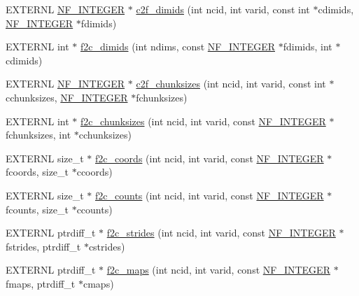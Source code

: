 \begin{DoxyCompactItemize}
\item 
E\+X\+T\+E\+R\+NL \hyperlink{ncfortran_8h_a0fd3f9e9fc30661142a1fb549af678e7}{N\+F\+\_\+\+I\+N\+T\+E\+G\+ER} $\ast$ \hyperlink{fort-lib_8c_a7ad9c588c0601d0aac54053a2dfc5fb1}{c2f\+\_\+dimids} (int ncid, int varid, const int $\ast$cdimids, \hyperlink{ncfortran_8h_a0fd3f9e9fc30661142a1fb549af678e7}{N\+F\+\_\+\+I\+N\+T\+E\+G\+ER} $\ast$fdimids)
\item 
E\+X\+T\+E\+R\+NL int $\ast$ \hyperlink{fort-lib_8c_a57c6778d70be42b3e959ab2343790189}{f2c\+\_\+dimids} (int ndims, const \hyperlink{ncfortran_8h_a0fd3f9e9fc30661142a1fb549af678e7}{N\+F\+\_\+\+I\+N\+T\+E\+G\+ER} $\ast$fdimids, int $\ast$cdimids)
\item 
E\+X\+T\+E\+R\+NL \hyperlink{ncfortran_8h_a0fd3f9e9fc30661142a1fb549af678e7}{N\+F\+\_\+\+I\+N\+T\+E\+G\+ER} $\ast$ \hyperlink{fort-lib_8c_a706533cd60fe8cc16c7268db18e64aa2}{c2f\+\_\+chunksizes} (int ncid, int varid, const int $\ast$cchunksizes, \hyperlink{ncfortran_8h_a0fd3f9e9fc30661142a1fb549af678e7}{N\+F\+\_\+\+I\+N\+T\+E\+G\+ER} $\ast$fchunksizes)
\item 
E\+X\+T\+E\+R\+NL int $\ast$ \hyperlink{fort-lib_8c_a2e587a74634daa53e8e5b12772243db8}{f2c\+\_\+chunksizes} (int ncid, int varid, const \hyperlink{ncfortran_8h_a0fd3f9e9fc30661142a1fb549af678e7}{N\+F\+\_\+\+I\+N\+T\+E\+G\+ER} $\ast$fchunksizes, int $\ast$cchunksizes)
\item 
E\+X\+T\+E\+R\+NL size\+\_\+t $\ast$ \hyperlink{fort-lib_8c_a8fc727da700ba3125fbeffcddc55a44d}{f2c\+\_\+coords} (int ncid, int varid, const \hyperlink{ncfortran_8h_a0fd3f9e9fc30661142a1fb549af678e7}{N\+F\+\_\+\+I\+N\+T\+E\+G\+ER} $\ast$fcoords, size\+\_\+t $\ast$ccoords)
\item 
E\+X\+T\+E\+R\+NL size\+\_\+t $\ast$ \hyperlink{fort-lib_8c_ae9f58d950cd1f1d82faf784c4db2c115}{f2c\+\_\+counts} (int ncid, int varid, const \hyperlink{ncfortran_8h_a0fd3f9e9fc30661142a1fb549af678e7}{N\+F\+\_\+\+I\+N\+T\+E\+G\+ER} $\ast$fcounts, size\+\_\+t $\ast$ccounts)
\item 
E\+X\+T\+E\+R\+NL ptrdiff\+\_\+t $\ast$ \hyperlink{fort-lib_8c_acdc8897d97daefc13edaadd990b8a566}{f2c\+\_\+strides} (int ncid, int varid, const \hyperlink{ncfortran_8h_a0fd3f9e9fc30661142a1fb549af678e7}{N\+F\+\_\+\+I\+N\+T\+E\+G\+ER} $\ast$fstrides, ptrdiff\+\_\+t $\ast$cstrides)
\item 
E\+X\+T\+E\+R\+NL ptrdiff\+\_\+t $\ast$ \hyperlink{fort-lib_8c_a67f01ea998846113dc84243e0f0e1201}{f2c\+\_\+maps} (int ncid, int varid, const \hyperlink{ncfortran_8h_a0fd3f9e9fc30661142a1fb549af678e7}{N\+F\+\_\+\+I\+N\+T\+E\+G\+ER} $\ast$fmaps, ptrdiff\+\_\+t $\ast$cmaps)

\end{DoxyCompactItemize}
